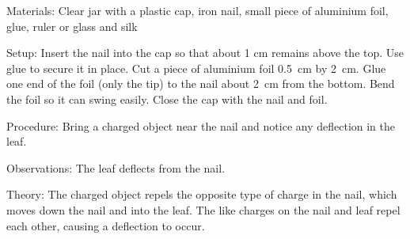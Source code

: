 \begin{multicols}{2}
\begin{description*}
\item[Materials:]{Clear jar with a plastic cap, iron nail, small piece of aluminium foil, glue, ruler or glass and silk}
\item[Setup:]{Insert the nail into the cap so that about 1 cm remains above the top. Use glue to secure it in place. Cut a piece of aluminium foil 0.5~cm by 2~cm. Glue one end of the foil (only the tip) to the nail about 2~cm from the bottom. Bend the foil so it can swing easily. Close the cap with the nail and foil.}
\item[Procedure:]{Bring a charged object near the nail and notice any deflection in the leaf.}
\item[Observations:]{The leaf deflects from the nail.}
\item[Theory:]{The charged object repels the opposite type of charge in the nail, which moves down the nail and into the leaf. The like charges on the nail and leaf repel each other, causing a deflection to occur.}
\end{description*}

%
%


\end{multicols}

